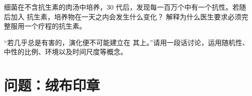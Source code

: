 \begin{exercise}[$\star\star\star$]\label{exo:g11:mutations:14}
细菌在不含抗生素的肉汤中培养，30
代后，发现每一百万个中有一个抗性。若随后加入
抗生素，培养物在一天之内会发生什么变化？
解释为什么医生要求必须完整服用一个疗程的抗生素。
\end{exercise}

\begin{exercise}[$\star\star\star$]\label{exo:g11:mutations:15}
“若几乎总是有害的，演化便不可能建立在
其上。”请用一段话讨论，运用随机性、
中性的比例、环境以及时间尺度等概念。
\end{exercise}

\section{问题：绒布印章}

